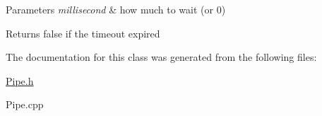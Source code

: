 \begin{DoxyParams}{Parameters}
{\em millisecond} & how much to wait (or 0) \\
\hline
\end{DoxyParams}
\begin{DoxyReturn}{Returns}
false if the timeout expired 
\end{DoxyReturn}


The documentation for this class was generated from the following files\-:\begin{DoxyCompactItemize}
\item 
\hyperlink{a00119}{Pipe.\-h}\item 
Pipe.\-cpp\end{DoxyCompactItemize}
